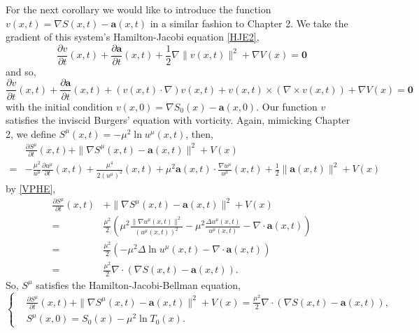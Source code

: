 \documentclass[a4paper,12pt,draft]{report}
\begin{document}
For the next corollary we would like to introduce the function $v(x, t) = \nabla S(x, t) - \mathbf{a}(x, t)$ in a similar fashion to Chapter 2.  We take the gradient of this system's Hamilton-Jacobi equation \eqref{HJE2},
$$
\frac{\partial v}{\partial t}(x, t) + \frac{\partial \mathbf{a}}{\partial t}(x, t) + \frac{1}{2}\nabla\|v(x, t)\|^2 + \nabla V(x) = \mathbf{0}
$$
and so,
\begin{equation}
\frac{\partial v}{\partial t}(x, t) + \frac{\partial \mathbf{a}}{\partial t}(x, t) + (v(x, t)\cdot\nabla)v(x, t) + v(x, t)\times(\nabla\times v(x, t)) + \nabla V(x) = \mathbf{0} \label{IBE}
\end{equation}
with the initial condition $v(x, 0) = \nabla S_0(x) - \mathbf{a}(x, 0)$.  Our function $v$ satisfies the inviscid Burgers' equation with vorticity.  Again, mimicking Chapter 2, we define $S^\mu(x, t) = -\mu^2\ln u^\mu(x, t)$, then,
\begin{align}
& \frac{\partial S^\mu}{\partial t}(x, t) + \|\nabla S^\mu(x, t) - \mathbf{a}(x, t)\|^2 + V(x)\nonumber\\
= & -\frac{\mu^2}{u^\mu}\frac{\partial u^\mu}{\partial t}(x, t) + \frac{\mu^4}{2(u^\mu)^2}(x, t) + \mu^2\mathbf{a}(x, t)\cdot\frac{\nabla u^\mu}{u^\mu}(x, t) + \frac{1}{2}\|\mathbf{a}(x, t)\|^2 + V(x)\nonumber
\end{align}
by \eqref{VPHE},
\begin{align}
\frac{\partial S^\mu}{\partial t}(x, t) & + \|\nabla S^\mu(x, t) - \mathbf{a}(x, t)\|^2 + V(x)\nonumber\\
= & \frac{\mu^2}{2}\left(\mu^2\frac{\|\nabla u^\mu(x, t)\|^2}{(u^\mu(x, t))^2} - \mu^2\frac{\Delta u^\mu(x, t)}{u^\mu(x, t)} - \nabla\cdot\mathbf{a}(x, t)\right)\nonumber\\
= & \frac{\mu^2}{2}(-\mu^2\Delta\ln u^\mu(x, t) - \nabla\cdot\mathbf{a}(x, t))\nonumber\\
= & \frac{\mu^2}{2}\nabla\cdot(\nabla S(x, t) - \mathbf{a}(x, t)).\nonumber
\end{align}
So, $S^\mu$ satisfies the Hamilton-Jacobi-Bellman equation,
\begin{equation}
\left\{
\begin{aligned}
& \frac{\partial S^\mu}{\partial t}(x, t) + \|\nabla S^\mu(x, t) - \mathbf{a}(x, t)\|^2 + V(x) = \frac{\mu^2}{2}\nabla\cdot(\nabla S(x, t) - \mathbf{a}(x, t)),\\
& S^\mu(x, 0) = S_0(x) - \mu^2\ln T_0(x).
\end{aligned}
\right.
\end{equation}
\end{document}
